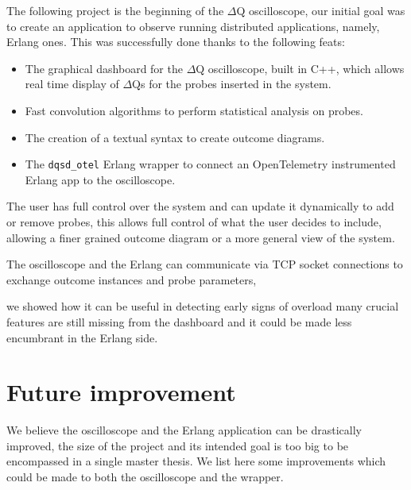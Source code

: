     The following project is the beginning of the $\Delta$Q oscilloscope, our initial goal was to create an application to observe running distributed applications, namely, Erlang ones.
    This was successfully done thanks to the following feats:
    \begin{itemize}
        \item The graphical dashboard for the $\Delta$Q oscilloscope, built in C++, which allows real time display of $\Delta$Qs for the probes inserted in the system.
        \item Fast convolution algorithms to perform statistical analysis on probes.
        \item The creation of a textual syntax to create outcome diagrams.
        \item The \texttt{dqsd\_otel} Erlang wrapper to connect an OpenTelemetry instrumented Erlang app to the oscilloscope.
    \end{itemize}
    The user has full control over the system and can update it dynamically to add or remove probes, this allows full control of what the user decides to include, allowing a finer grained outcome diagram or a more general view of the system.  

    The oscilloscope and the Erlang can communicate via TCP socket connections to exchange outcome instances and probe parameters,

    we showed how it can be useful in detecting early signs of overload many crucial features are still missing from the dashboard and it could be made less encumbrant in the Erlang side. 

    \section{Future improvement}
        We believe the oscilloscope and the Erlang application can be drastically improved, the size of the project and its intended goal is too big to be encompassed in a single master thesis. We list here some improvements which could be made to both the oscilloscope and the wrapper.
        
